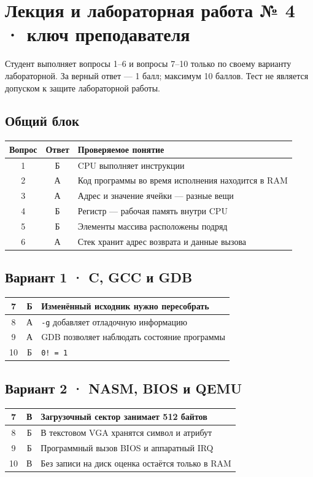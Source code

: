 \documentclass[a4paper,12pt]{extarticle}
\begin{document}
\section*{Лекция и лабораторная работа № 4 · ключ преподавателя}
Студент выполняет вопросы 1–6 и вопросы 7–10 только по своему варианту
лабораторной. За верный ответ — 1 балл; максимум 10 баллов. Тест не является
допуском к защите лабораторной работы.

\subsection*{Общий блок}
\begin{center}
\begin{tabular}{|c|c|l|}\hline
Вопрос & Ответ & Проверяемое понятие \\ \hline
1 & Б & CPU выполняет инструкции \\ \hline
2 & А & Код программы во время исполнения находится в RAM \\ \hline
3 & А & Адрес и значение ячейки — разные вещи \\ \hline
4 & Б & Регистр — рабочая память внутри CPU \\ \hline
5 & Б & Элементы массива расположены подряд \\ \hline
6 & А & Стек хранит адрес возврата и данные вызова \\ \hline
\end{tabular}
\end{center}

\subsection*{Вариант 1 · C, GCC и GDB}
\begin{center}
\begin{tabular}{|c|c|l|}\hline
7 & Б & Изменённый исходник нужно пересобрать \\ \hline
8 & А & \texttt{-g} добавляет отладочную информацию \\ \hline
9 & А & GDB позволяет наблюдать состояние программы \\ \hline
10 & Б & \texttt{0! = 1} \\ \hline
\end{tabular}
\end{center}

\subsection*{Вариант 2 · NASM, BIOS и QEMU}
\begin{center}
\begin{tabular}{|c|c|l|}\hline
7 & В & Загрузочный сектор занимает 512 байтов \\ \hline
8 & Б & В текстовом VGA хранятся символ и атрибут \\ \hline
9 & Б & Программный вызов BIOS и аппаратный IRQ \\ \hline
10 & В & Без записи на диск оценка остаётся только в RAM \\ \hline
\end{tabular}
\end{center}
\end{document}
